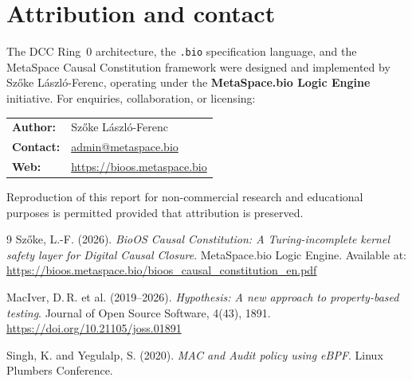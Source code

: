 \documentclass[11pt,a4paper]{article}
\theoremstyle{definition}
\begin{document}
\section{Attribution and contact}
\label{app:attribution}

The DCC Ring~0 architecture, the \texttt{.bio} specification language,
and the MetaSpace Causal Constitution framework were designed and implemented
by Szőke László-Ferenc, operating under the \textbf{MetaSpace.bio Logic Engine}
initiative. For enquiries, collaboration, or licensing:

\begin{center}
\begin{tabular}{ll}
\textbf{Author:}  & Szőke László-Ferenc \\
\textbf{Contact:} & \href{mailto:admin@metaspace.bio}{admin@metaspace.bio} \\
\textbf{Web:}     & \url{https://bioos.metaspace.bio} \\
\end{tabular}
\end{center}

Reproduction of this report for non-commercial research and educational
purposes is permitted provided that attribution is preserved.

\begin{thebibliography}{9}
Szőke, L.-F. (2026).
\textit{BioOS Causal Constitution: A Turing-incomplete kernel safety layer
for Digital Causal Closure}.
MetaSpace.bio Logic Engine. Available at:
\url{https://bioos.metaspace.bio/bioos_causal_constitution_en.pdf}

MacIver, D.\,R. et al. (2019--2026).
\textit{Hypothesis: A new approach to property-based testing}.
Journal of Open Source Software, 4(43), 1891.
\url{https://doi.org/10.21105/joss.01891}

Singh, K. and Yegulalp, S. (2020).
\textit{MAC and Audit policy using eBPF}.
Linux Plumbers Conference.
\end{thebibliography}
\end{document}
